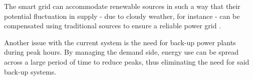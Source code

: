 The smart grid can accommodate renewable sources in such a way that their potential fluctuation in supply - due to cloudy weather, for instance - can be compensated using traditional sources to ensure a reliable power grid . 

Another issue with the current system is the need for back-up power plants during peak hours. By managing the demand side, energy use can be spread across a large period of time to reduce peaks, thus eliminating the need for said back-up systems. 




